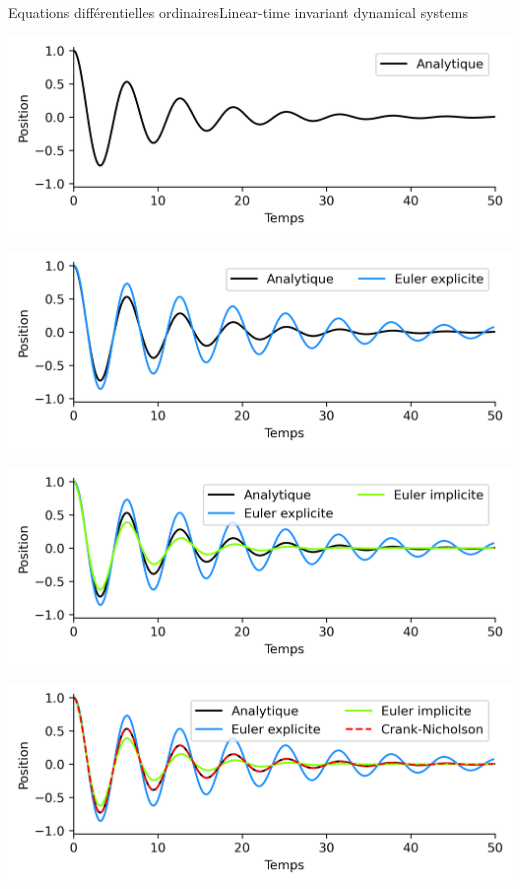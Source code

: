 \documentclass[usenames,dvipsnames,svgnames,10pt,aspectratio=169]{beamer}
\begin{document}
\begin{frame}[t, c]{Equations différentielles ordinaires}{Linear-time invariant dynamical systems}
  \begin{overprint}
    \centering
    \includegraphics[width=.8\textwidth]{analytic_solution}

    \centering
    \includegraphics[width=.8\textwidth]{explicit_solution}

    \centering
    \includegraphics[width=.8\textwidth]{implicit_solution}
    
    \centering
    \includegraphics[width=.8\textwidth]{crank_nicholson_solution}

  \end{overprint}
\end{frame}
\end{document}
